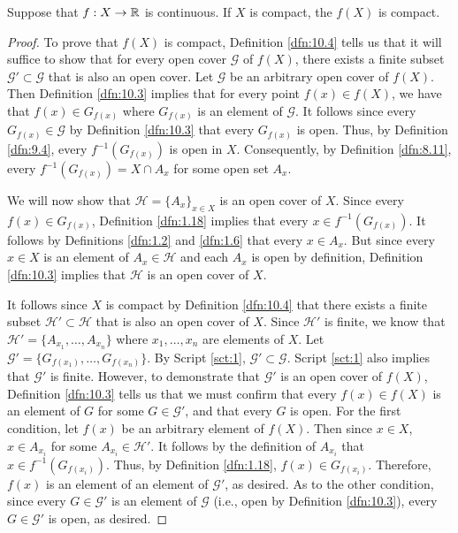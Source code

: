 \documentclass[../main.tex]{subfiles}
\begin{document}
\begin{theorem}\label{trm:10.19}
    Suppose that $f:X\to\mathbb{R}$ is continuous. If $X$ is compact, the $f(X)$ is compact.
    \begin{proof}
        To prove that $f(X)$ is compact, Definition \ref{dfn:10.4} tells us that it will suffice to show that for every open cover $\mathcal{G}$ of $f(X)$, there exists a finite subset $\mathcal{G}'\subset\mathcal{G}$ that is also an open cover. Let $\mathcal{G}$ be an arbitrary open cover of $f(X)$. Then Definition \ref{dfn:10.3} implies that for every point $f(x)\in f(X)$, we have that $f(x)\in G_{f(x)}$ where $G_{f(x)}$ is an element of $\mathcal{G}$. It follows since every $G_{f(x)}\in\mathcal{G}$ by Definition \ref{dfn:10.3} that every $G_{f(x)}$ is open. Thus, by Definition \ref{dfn:9.4}, every $f^{-1}(G_{f(x)})$ is open in $X$. Consequently, by Definition \ref{dfn:8.11}, every $f^{-1}(G_{f(x)})=X\cap A_x$ for some open set $A_x$.\par
        We will now show that $\mathcal{H}=\{A_x\}_{x\in X}$ is an open cover of $X$. Since every $f(x)\in G_{f(x)}$, Definition \ref{dfn:1.18} implies that every $x\in f^{-1}(G_{f(x)})$. It follows by Definitions \ref{dfn:1.2} and \ref{dfn:1.6} that every $x\in A_x$. But since every $x\in X$ is an element of $A_x\in\mathcal{H}$ and each $A_x$ is open by definition, Definition \ref{dfn:10.3} implies that $\mathcal{H}$ is an open cover of $X$.\par
        It follows since $X$ is compact by Definition \ref{dfn:10.4} that there exists a finite subset $\mathcal{H}'\subset\mathcal{H}$ that is also an open cover of $X$. Since $\mathcal{H}'$ is finite, we know that $\mathcal{H}'=\{A_{x_1},\dots,A_{x_n}\}$ where $x_1,\dots,x_n$ are elements of $X$. Let $\mathcal{G}'=\{G_{f(x_1)},\dots,G_{f(x_n)}\}$. By Script \ref{sct:1}, $\mathcal{G}'\subset\mathcal{G}$. Script \ref{sct:1} also implies that $\mathcal{G}'$ is finite. However, to demonstrate that $\mathcal{G}'$ is an open cover of $f(X)$, Definition \ref{dfn:10.3} tells us that we must confirm that every $f(x)\in f(X)$ is an element of $G$ for some $G\in\mathcal{G}'$, and that every $G$ is open. For the first condition, let $f(x)$ be an arbitrary element of $f(X)$. Then since $x\in X$, $x\in A_{x_i}$ for some $A_{x_i}\in\mathcal{H}'$. It follows by the definition of $A_{x_i}$ that $x\in f^{-1}(G_{f(x_i)})$. Thus, by Definition \ref{dfn:1.18}, $f(x)\in G_{f(x_i)}$. Therefore, $f(x)$ is an element of an element of $\mathcal{G}'$, as desired. As to the other condition, since every $G\in\mathcal{G}'$ is an element of $\mathcal{G}$ (i.e., open by Definition \ref{dfn:10.3}), every $G\in\mathcal{G}'$ is open, as desired.
    \end{proof}
\end{theorem}
\end{document}
